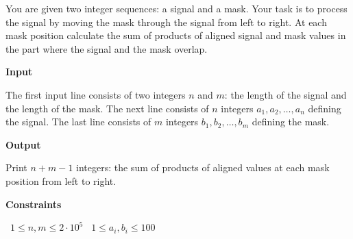 You are given two integer sequences: a signal and a mask. Your task is to process the signal by moving the mask through the signal from left to right. At each mask position calculate the sum of products of aligned signal and mask values in the part where the signal and the mask overlap.

\vspace{0.3cm}\noindent\textbf{Input}

The first input line consists of two integers $n$ and $m$: the length of the signal and the length of the mask.
The next line consists of $n$ integers $a_1,a_2,\ldots,a_n$ defining the signal.
The last line consists of $m$ integers $b_1,b_2,\ldots,b_m$ defining the mask.

\vspace{0.3cm}\noindent\textbf{Output}

Print $n+m-1$ integers: the sum of products of aligned values at each mask position from left to right.

\vspace{0.3cm}\noindent\textbf{Constraints}

\textbullet\ $1 \le n,m \le 2 \cdot 10^5$
\textbullet\ $1 \le a_i,b_i \le 100$